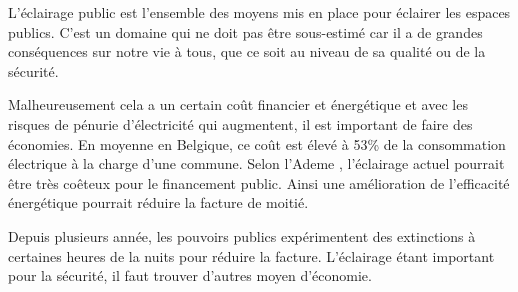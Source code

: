 

L'\'eclairage public est l'ensemble des moyens mis en place pour \'eclairer les espaces publics. C'est un domaine qui ne doit pas \^etre sous-estim\'e car il a de grandes cons\'equences sur notre vie \`a tous, que ce soit au niveau de sa qualit\'e ou de la s\'ecurit\'e. \cite{projwebsite}


Malheureusement cela a un certain co\^ut financier et \'energ\'etique et avec les risques de p\'enurie d'\'electricit\'e qui augmentent, il est important de faire des \'economies. En moyenne en Belgique, ce co\^ut est \'elev\'e \`a 53\% de la consommation \'electrique \`a la charge d'une commune. Selon l'Ademe \cite{ademe}, l'\'eclairage actuel pourrait \^etre tr\`es co\^eteux pour le financement public. Ainsi une am\'elioration de l'efficacit\'e \'energ\'etique pourrait r\'eduire la facture de moiti\'e.


Depuis plusieurs ann\'ee, les pouvoirs publics exp\'erimentent des extinctions \`a certaines heures de la nuits pour r\'eduire la facture. L'\'eclairage \'etant important pour la s\'ecurit\'e, il faut trouver d'autres moyen d'\'economie.